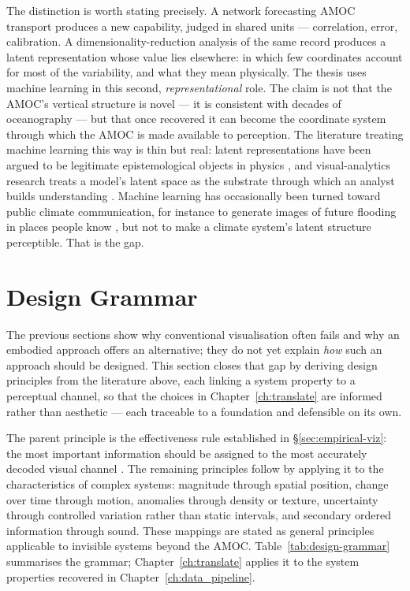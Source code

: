 The distinction is worth stating precisely. A network forecasting AMOC transport produces a new capability, judged in shared units --- correlation, error, calibration. A dimensionality-reduction analysis of the same record produces a latent representation whose value lies elsewhere: in which few coordinates account for most of the variability, and what they mean physically. The thesis uses machine learning in this second, \emph{representational} role. The claim is not that the AMOC's vertical structure is novel --- it is consistent with decades of oceanography \citep{hannachi2007, buckley2016} --- but that once recovered it can become the coordinate system through which the AMOC is made available to perception. The literature treating machine learning this way is thin but real: latent representations have been argued to be legitimate epistemological objects in physics \citep{iten2020}, and visual-analytics research treats a model's latent space as the substrate through which an analyst builds understanding \citep{sacha2018}. Machine learning has occasionally been turned toward public climate communication, for instance to generate images of future flooding in places people know \parencite{schmidt2022}, but not to make a climate system's latent structure perceptible. That is the gap.

\section{Design Grammar}
\label{sec:design-grammar}

The previous sections show why conventional visualisation often fails and why an embodied approach offers an alternative; they do not yet explain \emph{how} such an approach should be designed. This section closes that gap by deriving design principles from the literature above, each linking a system property to a perceptual channel, so that the choices in Chapter~\ref{ch:translate} are informed rather than aesthetic --- each traceable to a foundation and defensible on its own.

The parent principle is the effectiveness rule established in \S\ref{sec:empirical-viz}: the most important information should be assigned to the most accurately decoded visual channel \citep{bertin1983, clevelandmcgill1984, munzner2014}. The remaining principles follow by applying it to the characteristics of complex systems: magnitude through spatial position, change over time through motion, anomalies through density or texture, uncertainty through controlled variation rather than static intervals, and secondary ordered information through sound. These mappings are stated as general principles applicable to invisible systems beyond the AMOC. Table~\ref{tab:design-grammar} summarises the grammar; Chapter~\ref{ch:translate} applies it to the system properties recovered in Chapter~\ref{ch:data_pipeline}.

